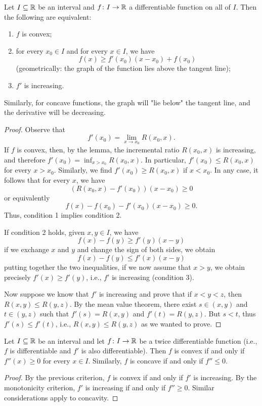 \begin{theorem}
\mymark{***}
Let $I\subseteq {\mathbb R}$ be an interval and $f\colon I \to {\mathbb R}$ a differentiable
function on all of $I$.
Then the following are equivalent:
\begin{enumerate}
\item $f$ is convex;
\item for every $x_0 \in I$ and for every $x\in I$, we have
\[
   f(x) \ge f'(x_0) (x-x_0) + f(x_0)
\]
(geometrically: the graph of the function lies above the tangent line);
\item $f'$ is increasing.
\end{enumerate}

Similarly, for concave functions, the graph will "lie below" the tangent line,
and the derivative will be decreasing.
\end{theorem}
%
\begin{proof}
\mymark{**}
Observe that
\[
  f'(x_0) = \lim_{x\to x_0} R(x_0,x).
\]
If $f$ is convex, then, by the lemma, the incremental ratio $R(x_0,x)$ is
increasing, and therefore $f'(x_0) = \inf_{x>x_0} R(x_0,x)$. In particular,
$f'(x_0) \le R(x_0,x)$ for every $x> x_0$. Similarly, we find $f'(x_0) \ge
R(x_0,x)$ if $x<x_0$.
In any case, it follows that for every $x$, we have
\[
(R(x_0,x)- f'(x_0))(x-x_0)\ge 0
\]
or equivalently
\[
  f(x) - f(x_0) - f'(x_0)(x-x_0) \ge 0.
\]
Thus, condition 1 implies condition 2.

If condition 2 holds, given $x,y \in I$, we have
\[
  f(x) - f(y) \ge f'(y)(x-y)
\]
if we exchange $x$ and $y$ and change the sign of both sides, we obtain
\[
  f(x) - f(y) \le f'(x)(x-y)
\]
putting together the two inequalities,
if we now assume that $x>y$, we obtain precisely
$f'(x) \ge f'(y)$, i.e., $f'$ is increasing (condition 3).

Now suppose we know that $f'$ is increasing 
and prove that if $x<y<z$, then $R(x,y) \le R(y,z)$.
By the mean value theorem, there exist $s\in (x,y)$ 
and $t\in (y,z)$ such that $f'(s) = R(x,y)$ and $f'(t) = R(y,z)$.
But $s<t$, thus $f'(s) \le f'(t)$, i.e., $R(x,y) \le R(y,z)$
as we wanted to prove.
\end{proof}

\begin{corollary}
\mymark{***}
Let $I\subseteq {\mathbb R}$ be an interval and let $f\colon I \to {\mathbb R}$ be a twice
differentiable function (i.e., $f$ is differentiable and $f'$ is also
differentiable).
Then $f$ is convex if and only if $f''(x)\ge 0$ for every $x\in I$.
Similarly, $f$ is concave if and only if $f''\le 0$.
\end{corollary}
\begin{proof}
\mymark{***}
By the previous criterion, $f$ is convex if and only if $f'$ is increasing. By
the monotonicity criterion, $f'$ is increasing if and only if $f'' \ge 0$.
Similar considerations apply to concavity.
\end{proof}

